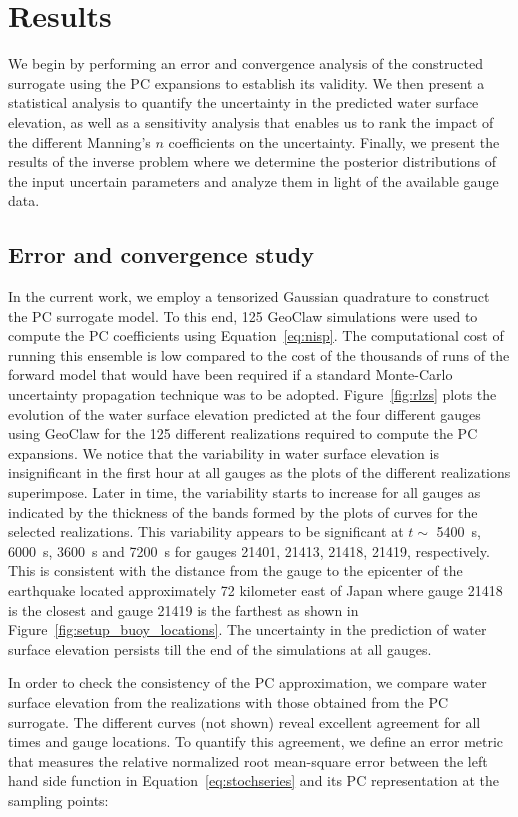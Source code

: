 \documentclass[review,12pt]{elsarticle}
\newcommand{\geoclaw}{{\sc GeoClaw}\xspace}
\begin{document}
\section{Results}
\label{sec:results}
We begin by performing an error and convergence 
analysis of the constructed surrogate using the PC expansions to 
establish its validity. We then present a statistical analysis to quantify the 
uncertainty in the predicted water surface elevation, as well as a 
sensitivity analysis that enables us to rank the impact of the 
different Manning's $n$ coefficients on the uncertainty. Finally, 
we present the results of the inverse problem 
where we determine the posterior distributions of the input uncertain
parameters and analyze them in light of the available gauge data.
\subsection{Error and convergence study}
\label{sec:analysis}

In the current work, we employ a tensorized Gaussian quadrature to construct the PC surrogate
model. To this end, 125 \geoclaw simulations were used to compute the PC coefficients using Equation~\ref{eq:nisp}.
The computational cost of running this ensemble is low compared to the cost of the thousands of 
runs of the forward model that would have been required if a standard Monte-Carlo uncertainty propagation technique was to be adopted.  Figure~\ref{fig:rlzs} plots the evolution of the
water surface elevation predicted at the four different gauges 
using \geoclaw for the 125 different realizations 
required to compute the PC expansions. We notice that the 
variability in water surface elevation is insignificant in the first 
hour at all gauges as the plots of the different realizations superimpose.
Later in time, the variability starts to increase for all gauges 
as indicated by the thickness of the bands formed by the plots of curves for the selected realizations.
This variability appears to be significant at $t\sim$ 5400~s, 6000~s, 3600~s and 7200~s
for gauges 21401, 21413, 21418, 21419, respectively.
This is consistent with the distance from the gauge to the epicenter of the earthquake located approximately 72 kilometer east of Japan where gauge 21418 is the closest and gauge 21419 is the farthest as shown in Figure~\ref{fig:setup_buoy_locations}.
The uncertainty in the prediction of water surface  elevation persists till the end of the simulations
at all gauges.

In order to check the consistency of the PC approximation, we compare
water surface elevation from the realizations 
with those obtained from the PC surrogate. The different curves (not shown) 
reveal excellent agreement for all times and gauge locations.
To quantify this agreement, we define
an error metric that measures the relative normalized root mean-square error between the left hand side function 
in Equation~\eqref{eq:stochseries} and its PC representation at the sampling points:
\end{document}
